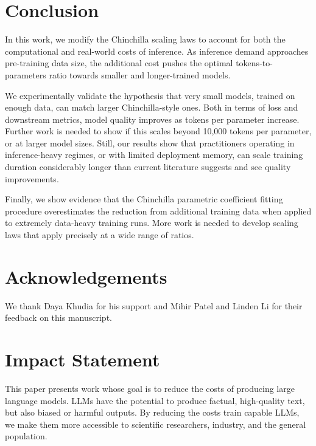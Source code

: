 \documentclass{article}
\theoremstyle{plain}
\theoremstyle{definition}
\theoremstyle{remark}
\begin{document}
\section{Conclusion}
In this work, we modify the Chinchilla scaling laws to account for both the computational and real-world costs of inference. As inference demand approaches pre-training data size, the additional cost pushes the optimal tokens-to-parameters ratio towards smaller and longer-trained models.

We experimentally validate the hypothesis that very small models, trained on enough data, can match larger Chinchilla-style ones. Both in terms of loss and downstream metrics, model quality improves as tokens per parameter increase. Further work is needed to show if this scales beyond 10,000 tokens per parameter, or at larger model sizes. Still, our results show that practitioners operating in inference-heavy regimes, or with limited deployment memory, can scale training duration considerably longer than current literature suggests and see quality improvements.

Finally, we show evidence that the Chinchilla parametric coefficient fitting procedure overestimates the reduction from additional training data when applied to extremely data-heavy training runs. More work is needed to develop scaling laws that apply precisely at a wide range of ratios.


\section*{Acknowledgements}
We thank Daya Khudia for his support and Mihir Patel and Linden Li for their feedback on this manuscript.

\section*{Impact Statement}
This paper presents work whose goal is to reduce the costs of producing large language models. LLMs have the potential to produce factual, high-quality text, but also biased or harmful outputs. By reducing the costs train capable LLMs, we make them more accessible to scientific researchers, industry, and the general population.





\newpage
\appendix
\onecolumn

\end{document}
